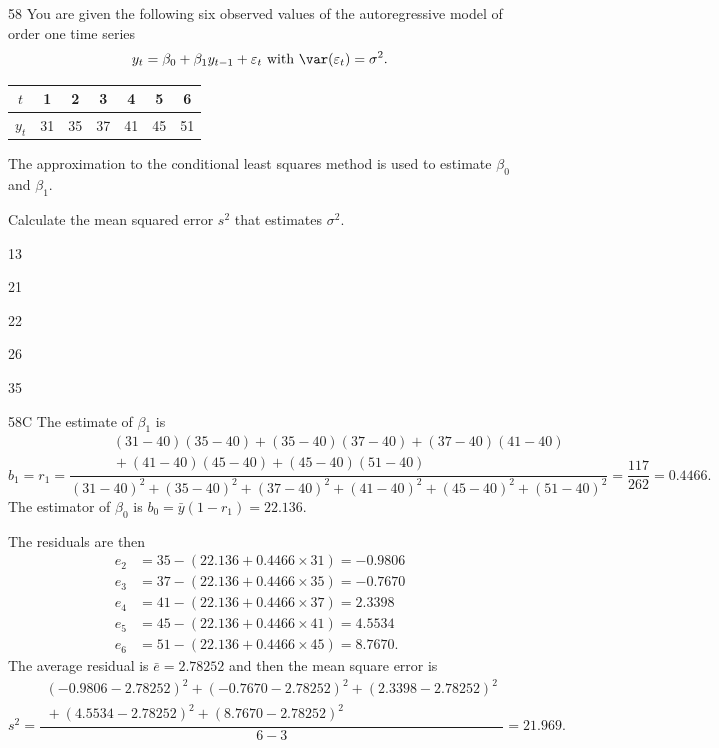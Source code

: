 \begin{question}{58}
You are given the following six observed values of the autoregressive model of order one time series
\[ y_t = \beta_0 + \beta_1 y_{t-1} + \varepsilon_t \text{ with } \var(\varepsilon_t) = \sigma^2. \]
\begin{center}
\begin{tabular}{|c|c|c|c|c|c|c|}
\hline
$t$   & 1  & 2  & 3  & 4  & 5  & 6  \\ \hline
$y_t$ & 31 & 35 & 37 & 41 & 45 & 51 \\ \hline
\end{tabular}
\end{center}

The approximation to the conditional least squares method is used to estimate $\beta_0$ and $\beta_1$.

Calculate the mean squared error $s^2$ that estimates $\sigma^2$.

\begin{choices}
\item 13
\item 21
\item 22
\item 26
\item 35
\end{choices}
\end{question}
\begin{solution}{58}{C}
The estimate of $\beta_1$ is
\[ b_1 = r_1 = \dfrac{\begin{array}{c} (31-40)(35-40) + (35-40)(37-40) + (37-40)(41-40) \\ {} + (41-40)(45-40) + (45-40)(51-40) \end{array}}{(31-40)^2 + (35-40)^2 + (37-40)^2 + (41-40)^2 + (45-40)^2 + (51-40)^2} = \frac{117}{262} = 0.4466. \]
The estimator of $\beta_0$ is $b_0 = \bar{y}(1 - r_1) = 22.136$.

The residuals are then
\begin{align*}
e_2 &= 35 - (22.136 + 0.4466 \times 31) = -0.9806 \\
e_3 &= 37 - (22.136 + 0.4466 \times 35) = -0.7670 \\
e_4 &= 41 - (22.136 + 0.4466 \times 37) = 2.3398 \\
e_5 &= 45 - (22.136 + 0.4466 \times 41) = 4.5534 \\
e_6 &= 51 - (22.136 + 0.4466 \times 45) = 8.7670.
\end{align*}
The average residual is $\bar{e} = 2.78252$ and then the mean square error is
\[ s^2 = \dfrac{\begin{array}{c} (-0.9806 - 2.78252)^2 + (-0.7670 - 2.78252)^2 + (2.3398 - 2.78252)^2 \\ {} + (4.5534 - 2.78252)^2 + (8.7670 - 2.78252)^2 \end{array}}{6 - 3} = 21.969. \]
\end{solution}

